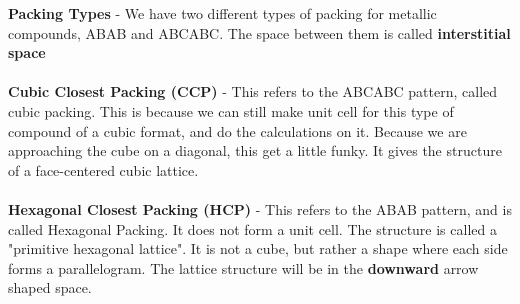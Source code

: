 \documentclass{article}
\begin{document}
\pagebreak


\textbf{Packing Types} - We have two different types of packing for metallic compounds, ABAB and ABCABC. The space between them is called \textbf{interstitial space} \\
\\
\textbf{Cubic Closest Packing (CCP)} - This refers to the ABCABC pattern, called cubic packing. This is because we can still make unit cell for this type of compound of a cubic format, and do the calculations on it. Because we are approaching the cube on a diagonal, this get a little funky. It gives the structure of a face-centered cubic lattice.\\
\\
\textbf{Hexagonal Closest Packing (HCP)} - This refers to the ABAB pattern, and is called Hexagonal Packing. It does not form a unit cell. The structure is called a "primitive hexagonal lattice". It is not a cube, but rather a shape where each side forms a parallelogram. The lattice structure will be in the \textbf{downward} arrow shaped space.


\end{document}

